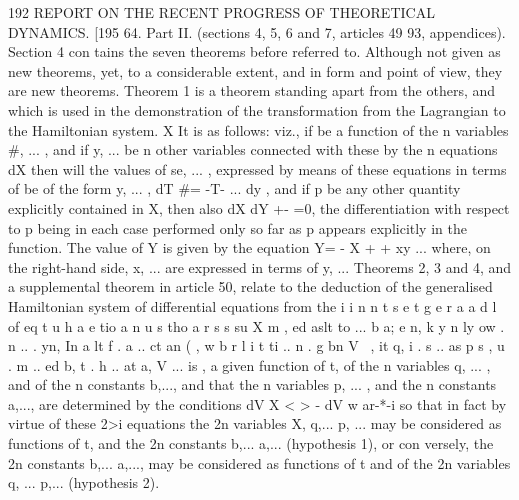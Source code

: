 \documentclass[11pt,a4paper]{book}
\begin{document}

192 REPORT ON THE RECENT PROGRESS OF THEORETICAL DYNAMICS.
[195
64. Part II. (sections 4, 5, 6 and 7, articles 49 93, appendices). Section 4 con
tains the seven theorems before referred to. Although not given as new theorems, yet,
to a considerable extent, and in form and point of view, they are new theorems.
Theorem 1 is a theorem standing apart from the others, and which is used in
the demonstration of the transformation from the Lagrangian to the Hamiltonian system.
X
It is as follows: viz., if be a function of the n variables #, ... , and if y, ... be
n other variables connected with these by the n equations
dX
then will the values of se, ... , expressed by means of these equations in terms of
be of the form
y, ... ,
dT
#=
-T- ...
dy ,
and if p be any other quantity explicitly contained in X, then also
dX dY
+- =0,
the differentiation with respect to p being in each case performed only so far as p
appears explicitly in the function.
The value of Y is given by the equation
Y= - X + +
xy ...
where, on the right-hand side, x, ... are expressed in terms of y, ...
Theorems 2, 3 and 4, and a supplemental theorem in article 50, relate to the
deduction of the generalised Hamiltonian system of differential equations from the
i i n n t s e t g e r a a d l of eq t u h a e tio a n u s tho a r s s su X m , ed aslt to ... b a; e n, k y n ly ow . n .. . yn, In a lt f . a .. ct an ( , w b r l i t ti .. n . g bn V \ , it q, i . s .. as p s , u . m .. ed b, t . h .. at a, V ... is ,
a given function of t, of the n variables q, ... , and of the n constants b,..., and that
the n variables p, ... , and the n constants a,..., are determined by the conditions
dV
X
< >
-%
dV w
ar-*-i
so that in fact by virtue of these 2>i equations the 2n variables X, q,... p, ... may be
considered as functions of t, and the 2n constants b,... a,... (hypothesis 1), or con
versely, the 2n constants b,... a,..., may be considered as functions of t and of the
2n variables q, ... p,... (hypothesis 2).


\end{document}
